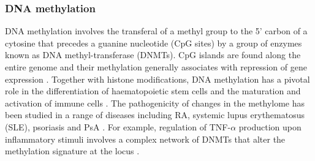 \subsubsection{DNA methylation}
DNA methylation involves the transferal of a methyl group to the 5' carbon of a cytosine that precedes a guanine nucleotide (CpG sites) by a group of enzymes known as DNA methyl-transferase (DNMTs). CpG islands are found along the entire genome and their methylation generally associates with repression of gene expression \parencite{Herman2003}. Together with histone modifications, DNA methylation has a pivotal role in the differentiation of haematopoietic stem cells and the maturation and activation of immune cells \parencite{Sellars2015,Lai2013}. 
The pathogenicity of changes in the methylome has been studied in a range of diseases including RA, systemic lupus erythematosus (SLE), psoriasis and PsA \parencite{Lei2009,Liu2013,Zhang2010}. For example, regulation of TNF-$\alpha$ production upon inflammatory stimuli involves a complex network of DNMTs that alter the methylation signature at the locus \parencite{Sullivan2007}. %


